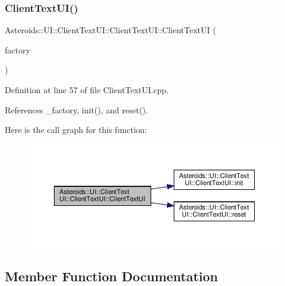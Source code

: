 \subsubsection{\texorpdfstring{Client\+Text\+U\+I()}{ClientTextUI()}}
{\footnotesize\ttfamily Asteroids\+::\+U\+I\+::\+Client\+Text\+U\+I\+::\+Client\+Text\+U\+I\+::\+Client\+Text\+UI (\begin{DoxyParamCaption}\item[{std\+::shared\+\_\+ptr$<$ \hyperlink{classAsteroids_1_1Domain_1_1Factory_1_1FactoryInterface}{Asteroids\+::\+Domain\+::\+Factory\+::\+Factory\+Interface} $>$}]{factory }\end{DoxyParamCaption})}



Definition at line 57 of file Client\+Text\+U\+I.\+cpp.



References \+\_\+factory, init(), and reset().

Here is the call graph for this function\+:\nopagebreak
\begin{figure}[H]
\begin{center}
\leavevmode
\includegraphics[width=350pt]{classAsteroids_1_1UI_1_1ClientTextUI_1_1ClientTextUI_aec13a3cf71cb24f12d9c9b44066e1243_cgraph}
\end{center}
\end{figure}


\subsection{Member Function Documentation}
\mbox{\label{classAsteroids_1_1UI_1_1ClientTextUI_1_1ClientTextUI_ac3cec81751843b8e8fa503af51b17546}} 
